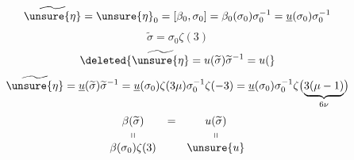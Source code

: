 
\[
\widetilde{\unsure{\eta}}=\unsure{\eta}_0=[\beta_0,\sigma_0]
=\beta_0(\sigma_0)\sigma_0^{-1}
=\underline u(\sigma_0)\sigma_0^{-1}
\]
\[
\widetilde\sigma=\sigma_0\zeta(3)
\]
\[
\deleted{\widetilde{\unsure{\eta}}=u(\widetilde\sigma)\widetilde\sigma^{-1}=u(}
\]
\[
\widetilde{\unsure{\eta}}
=\underline u(\widetilde\sigma)\widetilde\sigma^{-1}
=\underline u(\sigma_0)\zeta(3\mu)\sigma_0^{-1}\zeta(-3)
=\underline u(\sigma_0)\sigma_0^{-1}
  \zeta\bigl(\underbrace{3(\mu-1)}_{6\nu}\bigr)
\]
\[
\begin{array}{ccc}
\beta(\widetilde\sigma)&=&u(\widetilde\sigma)\\
\shortparallel&&\shortparallel\\
\beta(\sigma_0)\zeta(3)&&\unsure{u}
\end{array}
\]
